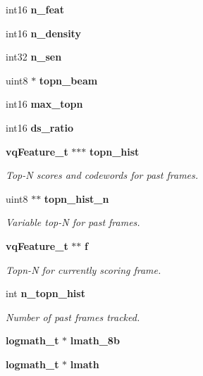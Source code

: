 \begin{DoxyCompactItemize}
\item 
int16 {\bfseries n\-\_\-feat}\label{structs2__semi__mgau__s_acc27ab32c9306b266eb8dbeb992b0dc2}

\item 
int16 {\bfseries n\-\_\-density}\label{structs2__semi__mgau__s_a976a8d1998fb717c7fee898eda43604b}

\item 
int32 {\bfseries n\-\_\-sen}\label{structs2__semi__mgau__s_a021287621e71f8b74f23197d0efd1e9e}

\item 
uint8 $\ast$ {\bfseries topn\-\_\-beam}\label{structs2__semi__mgau__s_af530876b144ac13df103afe2ccdba2fc}

\item 
int16 {\bfseries max\-\_\-topn}\label{structs2__semi__mgau__s_adda80afc828a938dcdd08f976417d35a}

\item 
int16 {\bfseries ds\-\_\-ratio}\label{structs2__semi__mgau__s_a91b9da8bb484f4552ba0ff47cb262d17}

\item 
{\bf vq\-Feature\-\_\-t} $\ast$$\ast$$\ast$ {\bf topn\-\_\-hist}
\begin{DoxyCompactList}\small\item\em Top-\/\-N scores and codewords for past frames. \end{DoxyCompactList}\item 
uint8 $\ast$$\ast$ {\bf topn\-\_\-hist\-\_\-n}
\begin{DoxyCompactList}\small\item\em Variable top-\/\-N for past frames. \end{DoxyCompactList}\item 
{\bf vq\-Feature\-\_\-t} $\ast$$\ast$ {\bf f}
\begin{DoxyCompactList}\small\item\em Topn-\/\-N for currently scoring frame. \end{DoxyCompactList}\item 
int {\bf n\-\_\-topn\-\_\-hist}
\begin{DoxyCompactList}\small\item\em Number of past frames tracked. \end{DoxyCompactList}\item 
{\bf logmath\-\_\-t} $\ast$ {\bfseries lmath\-\_\-8b}\label{structs2__semi__mgau__s_a1900c90c8ab30d38288fb26b402eb325}

\item 
{\bf logmath\-\_\-t} $\ast$ {\bfseries lmath}\label{structs2__semi__mgau__s_a8f8f7c72297132fb9a939c9981562ae6}

\end{DoxyCompactItemize}



